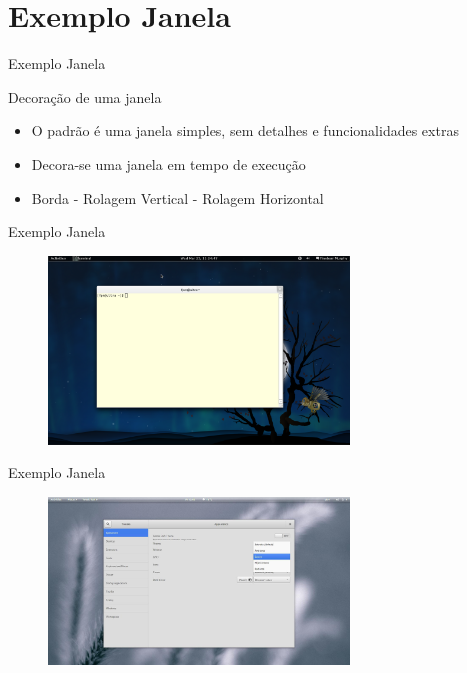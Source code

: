 \section{Exemplo Janela}

\begin{frame}{Exemplo Janela}{}
\begin{block}{Decoração de uma janela}
  \begin{itemize}
    \item<1-> O padrão é uma janela simples, sem detalhes e funcionalidades extras
    \item<1-> Decora-se uma janela em tempo de execução
    \item<1-> Borda - Rolagem Vertical - Rolagem Horizontal
  \end{itemize}
\end{block}
\end{frame}


\begin{frame}{Exemplo Janela}{}
\begin{block}{}
  \begin{figure}
    \includegraphics[width=8cm]{figuras/ex1}
  \end{figure}
\end{block}
\end{frame}

\begin{frame}{Exemplo Janela}{}
\begin{block}{}
  \begin{figure}
    \includegraphics[width=8cm]{figuras/window_decorator}
  \end{figure}
\end{block}
\end{frame}
